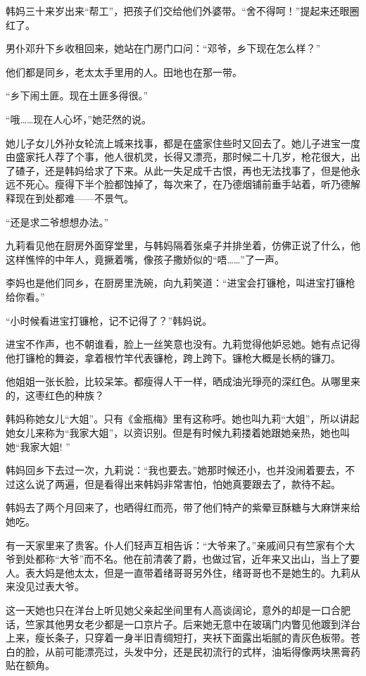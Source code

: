 \par 韩妈三十来岁出来“帮工”，把孩子们交给他们外婆带。“舍不得呵！”提起来还眼圈红了。
\par 男仆邓升下乡收租回来，她站在门房门口问：“邓爷，乡下现在怎么样？”
\par 他们都是同乡，老太太手里用的人。田地也在那一带。
\par “乡下闹土匪。现在土匪多得很。”
\par “哦……现在人心坏，”她茫然的说。
\par 她儿子女儿外孙女轮流上城来找事，都是在盛家住些时又回去了。她儿子进宝一度由盛家托人荐了个事，他人很机灵，长得又漂亮，那时候二十几岁，枪花很大，出了碴子，还是韩妈给求了下来。从此一失足成千古恨，再也无法找事了，但是他永远不死心。瘦得下半个脸都蚀掉了，每次来了，在乃德烟铺前垂手站着，听乃德解释现在到处都难——不景气。
\par “还是求二爷想想办法。”
\par 九莉看见他在厨房外面穿堂里，与韩妈隔着张桌子并排坐着，仿佛正说了什么，他这样憔悴的中年人，竟撅着嘴，像孩子撒娇似的“唔……”了一声。
\par 李妈也是他们同乡，在厨房里洗碗，向九莉笑道：“进宝会打镰枪，叫进宝打镰枪给你看。”
\par “小时候看进宝打镰枪，记不记得了？”韩妈说。
\par 进宝不作声，也不朝谁看，脸上一丝笑意也没有。九莉觉得他妒忌她。她有点记得他打镰枪的舞姿，拿着根竹竿代表镰枪，跨上跨下。镰枪大概是长柄的镰刀。
\par 他姐姐一张长脸，比较呆笨。都瘦得人干一样，晒成油光琤亮的深红色。从哪里来的，这枣红色的种族？
\par 韩妈称她女儿“大姐”。只有《金瓶梅》里有这称呼。她也叫九莉“大姐”，所以讲起她女儿来称为“我家大姐”，以资识别。但是有时候九莉搂着她跟她亲热，她也叫她“我家大姐! ”
\par 韩妈回乡下去过一次，九莉说：“我也要去。”她那时候还小，也并没闹着要去，不过这么说了两遍，但是看得出来韩妈非常害怕，怕她真要跟去了，款待不起。
\par 韩妈去了两个月回来了，也晒得红而亮，带了他们特产的紫晕豆酥糖与大麻饼来给她吃。
\par 有一天家里来了贵客。仆人们轻声互相告诉：“大爷来了。”亲戚间只有竺家有个大爷到处都称“大爷”而不名。他在前清袭了爵，也做过官，近年来又出山，当上了要人。表大妈是他太太，但是一直带着绪哥哥另外住，绪哥哥也不是她生的。九莉从来没见过表大爷。
\par 这一天她也只在洋台上听见她父亲起坐间里有人高谈阔论，意外的却是一口合肥话，竺家其他男女老少都是一口京片子。后来她无意中在玻璃门内瞥见他踱到洋台上来，瘦长条子，只穿着一身半旧青绸短打，夹袄下面露出垢腻的青灰色板带。苍白的脸，从前可能漂亮过，头发中分，还是民初流行的式样，油垢得像两块黑膏药贴在额角。
